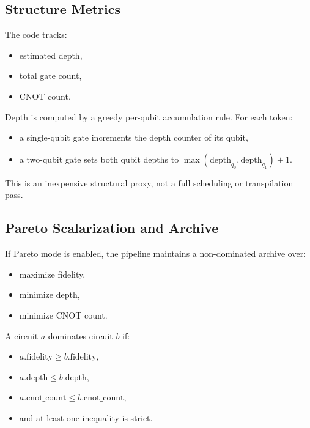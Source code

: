 \documentclass[11pt]{article}
\begin{document}
\subsection{Structure Metrics}

The code tracks:

\begin{itemize}[leftmargin=*]
\item estimated depth,
\item total gate count,
\item CNOT count.
\end{itemize}

Depth is computed by a greedy per-qubit accumulation rule. For each token:

\begin{itemize}[leftmargin=*]
\item a single-qubit gate increments the depth counter of its qubit,
\item a two-qubit gate sets both qubit depths to $\max(\mathrm{depth}_{q_0}, \mathrm{depth}_{q_1}) + 1$.
\end{itemize}

This is an inexpensive structural proxy, not a full scheduling or transpilation pass.

\subsection{Pareto Scalarization and Archive}

If Pareto mode is enabled, the pipeline maintains a non-dominated archive over:

\begin{itemize}[leftmargin=*]
\item maximize fidelity,
\item minimize depth,
\item minimize CNOT count.
\end{itemize}

A circuit $a$ dominates circuit $b$ if:

\begin{itemize}[leftmargin=*]
\item $a.\mathrm{fidelity} \ge b.\mathrm{fidelity}$,
\item $a.\mathrm{depth} \le b.\mathrm{depth}$,
\item $a.\mathrm{cnot\_count} \le b.\mathrm{cnot\_count}$,
\item and at least one inequality is strict.
\end{itemize}
\end{document}

